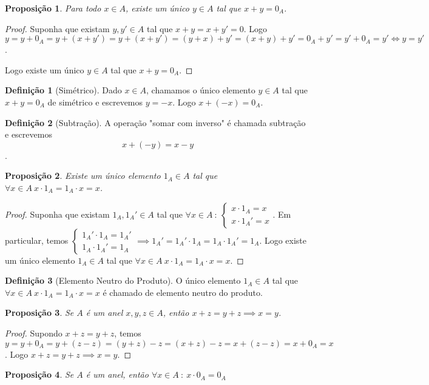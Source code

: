 \documentclass{article}
\newtheorem{prop}{Proposição}[section]
\theoremstyle{theorem}
\theoremstyle{lemma}
\theoremstyle{definition}
\newtheorem{definicao}{Definição}[section]
\theoremstyle{remark}
\begin{document}
\begin{prop}
	Para todo $x\in A$, existe um único $y \in A$ tal que $x+y = 0_A$.
\end{prop}
\begin{proof}
	Suponha que existam $y,y' \in A$ tal que $x + y = x+y' = 0$. Logo $y = y+0_A = y+(x+y') = y+(x+y') = (y+x) +y' = (x+y)+y' = 0_A +y' = y'+0_A = y' \iff y = y'$.

	Logo existe um único $y\in A$ tal que $x+y = 0_A$.
\end{proof}
\begin{definicao}[Simétrico]
	Dado $x\in A$, chamamos o único elemento $y\in A$ tal que $x+y = 0_A$ de simétrico e escrevemos $y = -x$. Logo $x+(-x) = 0_A$.
\end{definicao}
\begin{definicao}[Subtração]
	A operação "somar com inverso" é chamada subtração e escrevemos $$x+(-y) = x-y$$.
\end{definicao}
\begin{prop}
	Existe um único elemento $1_A\in A$ tal que $\forall x\in A \: x\cdot 1_A = 1_A\cdot x = x$.
\end{prop}
\begin{proof}
	Suponha que existam $1_A,1_A'\in A$ tal que $\forall x\in A \: : \:  \begin{cases} x\cdot 1_A = x \\ x\cdot1_A' = x\end{cases}$. Em particular, temos  $\begin{cases} 1_A'\cdot 1_A = 1_A' \\ 1_A\cdot1_A' = 1_A\end{cases} \implies 1_A' = 1_A'\cdot 1_A = 1_A\cdot 1_A' = 1_A$.
		Logo existe um único elemento $1_A\in A$ tal que $\forall x\in A \: x\cdot 1_A = 1_A\cdot x  = x$.
\end{proof}
\begin{definicao}[Elemento Neutro do Produto]
	O único elemento $1_A\in A$ tal que $\forall x\in A \: x\cdot 1_A = 1_A\cdot x = x$ é chamado de elemento neutro do produto.
\end{definicao}
\begin{prop}
	Se $A$ é um anel  $x,y,z\in A$, então  $ x+z = y+z \implies x  =y $.
\end{prop}
\begin{proof}
		Supondo $x+z = y+z$,  temos  $ y = y +0_A = y + (z-z) = (y+z) -z = (x+z) - z = x+(z-z) = x+0_A = x$. Logo $ x+z = y+z \implies x  =y $.
\end{proof}
\begin{prop}
	Se $A$ é um anel, então $\forall x \in A \: : \: x\cdot 0_A = 0_A$
\end{prop}
\end{document}
